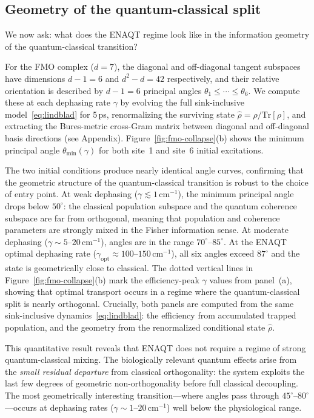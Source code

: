 \documentclass[12pt,a4paper]{article}
\theoremstyle{definition}
\theoremstyle{remark}
\begin{document}
\subsection{Geometry of the quantum-classical split}
\label{sec:fmo-geometry}

We now ask: what does the ENAQT regime look like in the information geometry of the quantum-classical transition?

For the FMO complex ($d = 7$), the diagonal and off-diagonal tangent subspaces have dimensions $d - 1 = 6$ and $d^2 - d = 42$ respectively, and their relative orientation is described by $d - 1 = 6$ principal angles $\theta_1 \leq \cdots \leq \theta_6$. We compute these at each dephasing rate $\gamma$ by evolving the full sink-inclusive model~\eqref{eq:lindblad} for 5\,ps, renormalizing the surviving state $\hat{\rho} = \rho/\mathrm{Tr}[\rho]$, and extracting the Bures-metric cross-Gram matrix between diagonal and off-diagonal basis directions (see Appendix). Figure~\ref{fig:fmo-collapse}(b) shows the minimum principal angle $\theta_{\min}(\gamma)$ for both site~1 and site~6 initial excitations.

The two initial conditions produce nearly identical angle curves, confirming that the geometric structure of the quantum-classical transition is robust to the choice of entry point. At weak dephasing ($\gamma \lesssim 1$\,cm$^{-1}$), the minimum principal angle drops below $50^\circ$: the classical population subspace and the quantum coherence subspace are far from orthogonal, meaning that population and coherence parameters are strongly mixed in the Fisher information sense. At moderate dephasing ($\gamma \sim 5$--$20$\,cm$^{-1}$), angles are in the range $70^\circ$--$85^\circ$. At the ENAQT optimal dephasing rate ($\gamma_{\mathrm{opt}} \approx 100$--$150$\,cm$^{-1}$), all six angles exceed $87^\circ$ and the state is geometrically close to classical. The dotted vertical lines in Figure~\ref{fig:fmo-collapse}(b) mark the efficiency-peak $\gamma$ values from panel~(a), showing that optimal transport occurs in a regime where the quantum-classical split is nearly orthogonal. Crucially, both panels are computed from the same sink-inclusive dynamics~\eqref{eq:lindblad}: the efficiency from accumulated trapped population, and the geometry from the renormalized conditional state $\hat{\rho}$.

This quantitative result reveals that ENAQT does not require a regime of strong quantum-classical mixing. The biologically relevant quantum effects arise from the \emph{small residual departure} from classical orthogonality: the system exploits the last few degrees of geometric non-orthogonality before full classical decoupling. The most geometrically interesting transition---where angles pass through $45^\circ$--$80^\circ$---occurs at dephasing rates ($\gamma \sim 1$--$20$\,cm$^{-1}$) well below the physiological range.
\end{document}
